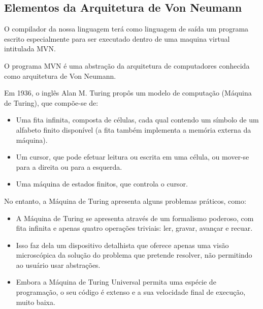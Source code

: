 
\subsection{Elementos da Arquitetura de Von Neumann}
  \label{chap:el_von_neumann}

O compilador da nossa linguagem terá como linguagem de saída um programa escrito especialmente para ser executado dentro de uma maquina virtual intitulada MVN.


O programa MVN é uma abstração da arquitetura de computadores conhecida como arquitetura de Von Neumann. 


Em 1936, o inglês Alan M. Turing propôs um modelo de computação (Máquina de Turing), que compõe-se de:
\begin{itemize}
	\item Uma fita infinita, composta de células, cada qual contendo um símbolo de um alfabeto finito disponível (a fita também implementa a memória externa da máquina).
	\item Um cursor, que pode efetuar leitura ou escrita em uma célula, ou mover-se para a direita ou para a esquerda.
	\item Uma máquina de estados finitos, que controla o cursor.
\end{itemize}


No entanto, a Máquina de Turing apresenta alguns problemas práticos, como:
\begin{itemize}
	\item A Máquina de Turing se apresenta através de um formalismo poderoso, com fita infinita e apenas quatro operações triviais: ler, gravar, avançar e recuar.
	\item Isso faz dela um dispositivo detalhista que oferece apenas uma visão microscópica da solução do problema que pretende resolver, não permitindo ao usuário usar abstrações.
	\item Embora a Máquina de Turing Universal permita uma espécie de programação, o seu código é extenso e a sua velocidade final de execução, muito baixa.
\end{itemize}


